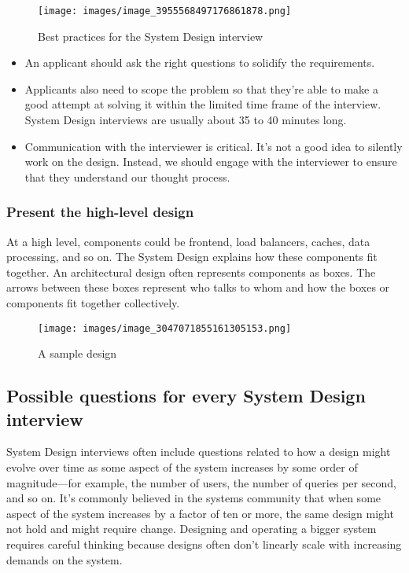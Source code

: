 \begin{figure}[htbp]
    \centering
    \texttt{[image: images/image\_3955568497176861878.png]}
    \caption{Best practices for the System Design interview}
\end{figure}

\begin{itemize} \item {}\label{BkHabk7AURmxR6IR-ch_a} An applicant should ask the right questions to solidify the requirements. \item {}\label{tMnQnmcrx93uB5IFGVFMX} Applicants also need to scope the problem so that they're able to make a good attempt at solving it within the limited time frame of the interview. 
System Design interviews are usually about 35 to 40 minutes long. \item {}\label{CncjPzeO-3fVJ2QM2o_ip} Communication with the interviewer is critical. 
It's not a good idea to silently work on the design. 
Instead, we should engage with the interviewer to ensure that they understand our thought process. \end{itemize} \subsubsection{Present the high-level design}\label{RwSzNg6izH6FhCXOl7kS4} At a high level, components could be frontend, load balancers, caches, data processing, and so on. 
The System Design explains how these components fit together. 
An architectural design often represents components as boxes. 
The arrows between these boxes represent who talks to whom and how the boxes or components fit together collectively.

\begin{figure}[htbp]
    \centering
    \texttt{[image: images/image\_3047071855161305153.png]}
    \caption{A sample design}
\end{figure}

\subsection{Possible questions for every System Design interview}\label{N0oqEUUvDaJbCsC9k12Oe} System Design interviews often include questions related to how a design might evolve over time as some aspect of the system increases by some order of magnitude---for example, the number of users, the number of queries per second, and so on. 
It's commonly believed in the systems community that when some aspect of the system increases by a factor of ten or more, the same design might not hold and might require change. 
Designing and operating a bigger system requires careful thinking because designs often don't linearly scale with increasing demands on the system.

